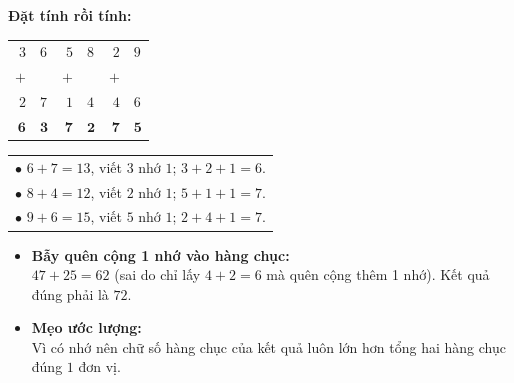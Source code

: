 \documentclass[11pt,a4paper]{article}
\begin{document}
\vspace{-1.5mm}
\noindent
\begin{minipage}[t]{0.49\textwidth}\vspace{0pt}
\begin{tcolorbox}[
  enhanced,
  colback=green!4!white,
  colframe=green!60!black,
  arc=2mm, boxrule=0.8pt,
  left=2mm, right=2mm, top=1.8mm, bottom=1.8mm,
  title={\footnotesize\bfseries\color{white}\faCheckCircle\ 4. Ví dụ thực hành chuẩn mực}
]
{\footnotesize
\textbf{Đặt tính rồi tính:}\\
\begin{tabular}{r@{\,}lr@{\,}lr@{\,}l}
  $3$ & $6$ & $5$ & $8$ & $2$ & $9$ \\
$+$ & & $+$ & & $+$ & \\
  $2$ & $7$ & $1$ & $4$ & $4$ & $6$ \\ \hline
  $\mathbf{6}$ & $\mathbf{3}$ & $\mathbf{7}$ & $\mathbf{2}$ & $\mathbf{7}$ & $\mathbf{5}$
\end{tabular}
\quad
\begin{tabular}{l}
  $\bullet$ $6+7=13$, viết $3$ nhớ $1$; $3+2+1=6$.\\
  $\bullet$ $8+4=12$, viết $2$ nhớ $1$; $5+1+1=7$.\\
  $\bullet$ $9+6=15$, viết $5$ nhớ $1$; $2+4+1=7$.
\end{tabular}
}
\end{tcolorbox}
\end{minipage}
\hfill
\begin{minipage}[t]{0.49\textwidth}\vspace{0pt}
\begin{tcolorbox}[
  enhanced,
  colback=red!4!white,
  colframe=red!75!black,
  arc=2mm, boxrule=0.8pt,
  left=2mm, right=2mm, top=1.8mm, bottom=1.8mm,
  title={\footnotesize\bfseries\color{white}\faExclamationTriangle\ 5. Mẹo tránh bẫy trắc nghiệm}
]
{\footnotesize
\begin{itemize}\setlength{\itemsep}{1pt}\setlength{\leftskip}{-2.5mm}
  \item \textbf{Bẫy quên cộng 1 nhớ vào hàng chục:}\\
  $47 + 25 = 62$ (sai do chỉ lấy $4+2=6$ mà quên cộng thêm 1 nhớ). Kết quả đúng phải là $72$.
  \item \textbf{Mẹo ước lượng:}\\
  Vì có nhớ nên chữ số hàng chục của kết quả luôn lớn hơn tổng hai hàng chục đúng $1$ đơn vị.
\end{itemize}
}
\end{tcolorbox}
\end{minipage}
\end{document}
